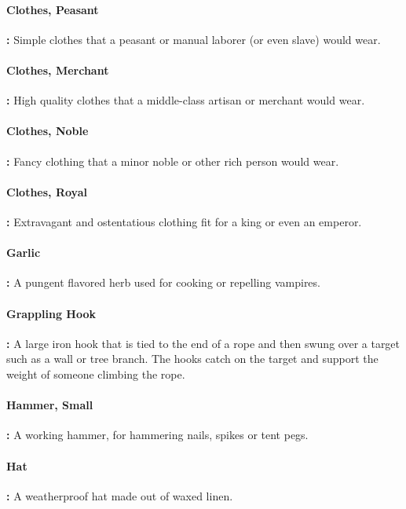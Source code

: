 \begin{multicols*}{2}
\paragraph{Clothes, Peasant}\textbf{:} Simple clothes that a peasant or manual laborer (or even slave) would wear.

\paragraph{Clothes, Merchant}\textbf{:} High quality clothes that a middle-class artisan or merchant would wear.

\paragraph{Clothes, Noble}\textbf{:} Fancy clothing that a minor noble or other rich person would wear.

\paragraph{Clothes, Royal}\textbf{:} Extravagant and ostentatious clothing fit for a king or even an emperor.

\paragraph{Garlic}\textbf{:} A pungent flavored herb used for cooking or repelling vampires.

\paragraph{Grappling Hook}\textbf{:} A large iron hook that is tied to the end of a rope and then swung over a target such as a wall or tree branch. The hooks catch on the target and support the weight of someone climbing the rope.

\paragraph{Hammer, Small}\textbf{:} A working hammer, for hammering nails, spikes or tent pegs.

\paragraph{Hat}\textbf{:} A weatherproof hat made out of waxed linen.


\end{multicols*}
